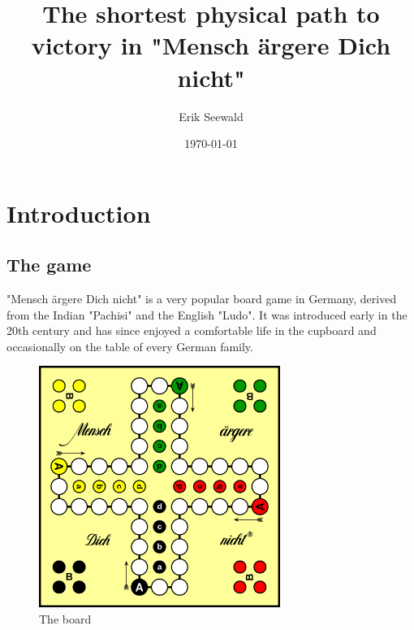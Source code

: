 \documentclass[12pt]{article}
\title{The shortest physical path to victory in "Mensch ärgere Dich nicht"}
\author{Erik Seewald}
\date{\today}
\begin{document}
\maketitle

\tableofcontents

\newpage

\section{Introduction}

\subsection{The game}

"Mensch ärgere Dich nicht" is a very popular board game in Germany, derived from the Indian "Pachisi" and the English "Ludo".
It was introduced early in the 20th century and has since enjoyed a comfortable life in the cupboard and occasionally on the table
of every German family.

\begin{figure}[htbp]
    \centering
    \includegraphics[width=0.7\textwidth]{images/Figure1}
    \caption{The board}
    \label{fig:board}
\end{figure}
\end{document}
